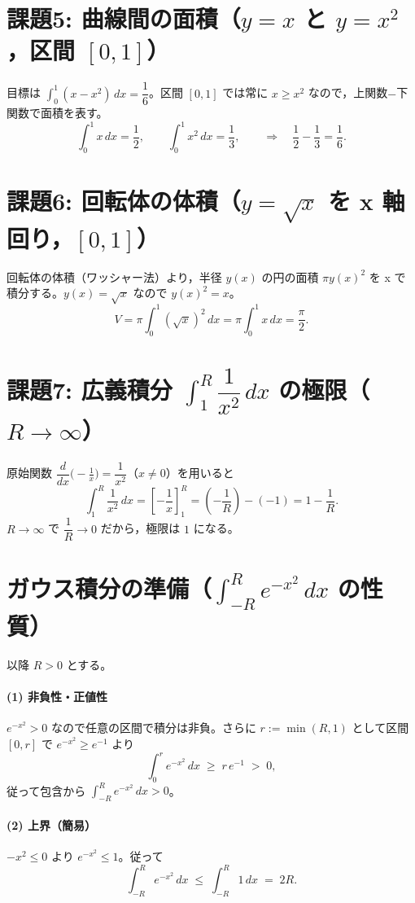 \documentclass[a4paper,12pt]{jsarticle}
\begin{document}
\section{課題5: 曲線間の面積（$y=x$ と $y=x^2$，区間 $[0,1]$）}
目標は $\int_0^1 (x - x^2)\,dx = \dfrac{1}{6}$。区間 $[0,1]$ では常に $x \ge x^2$ なので，上関数$-$下関数で面積を表す。
\[
  \int_0^1 x\,dx = \frac{1}{2},\qquad \int_0^1 x^2\,dx = \frac{1}{3},\qquad \Rightarrow\quad \frac{1}{2} - \frac{1}{3} = \frac{1}{6}.
\]

\section{課題6: 回転体の体積（$y=\sqrt{x}$ を x 軸回り，$[0,1]$）}
回転体の体積（ワッシャー法）より，半径 $y(x)$ の円の面積 $\pi y(x)^2$ を x で積分する。$y(x)=\sqrt{x}$ なので $y(x)^2 = x$。
\[
  V = \pi \int_0^1 (\sqrt{x})^2\,dx = \pi \int_0^1 x\,dx = \frac{\pi}{2}.
\]

\section{課題7: 広義積分 $\int_1^R \dfrac{1}{x^2}\,dx$ の極限（$R\to\infty$）}
原始関数 $\dfrac{d}{dx}\bigl(-\tfrac{1}{x}\bigr) = \dfrac{1}{x^2}$（$x\ne 0$）を用いると
\[
  \int_1^R \frac{1}{x^2}\,dx = \left[-\frac{1}{x}\right]_1^R = \left(-\frac{1}{R}\right) - \left(-1\right) = 1 - \frac{1}{R}.
\]
$R\to\infty$ で $\dfrac{1}{R}\to 0$ だから，極限は $1$ になる。

\section{ガウス積分の準備（$\int_{-R}^{R} e^{-x^2}\,dx$ の性質）}
以降 $R>0$ とする。

\paragraph{(1) 非負性・正値性} $e^{-x^2}>0$ なので任意の区間で積分は非負。さらに $r:=\min(R,1)$ として区間 $[0,r]$ で $e^{-x^2}\ge e^{-1}$ より
\[
  \int_0^r e^{-x^2}\,dx \;\ge\; r\,e^{-1} \;>\; 0,
\]
従って包含から $\int_{-R}^{R} e^{-x^2}\,dx>0$。

\paragraph{(2) 上界（簡易）} $-x^2\le 0$ より $e^{-x^2}\le 1$。従って
\[
  \int_{-R}^{R} e^{-x^2}\,dx \;\le\; \int_{-R}^{R} 1\,dx \;=\; 2R.
\]
\end{document}
